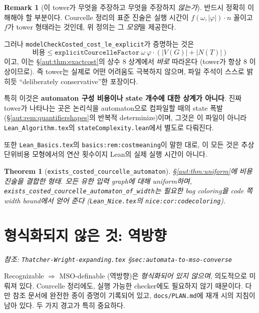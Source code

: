\documentclass[11pt]{article}
\theoremstyle{definition}
\newtheorem{remark}[definition]{Remark}
\theoremstyle{plain}
\newtheorem{theorem}[definition]{Theorem}
\newcommand{\MSO}{\mathrm{MSO}}
\newcommand{\lean}[1]{\texttt{#1}}
\newcommand{\leanfile}[1]{\texttt{#1}}
\begin{document}
\begin{remark}[이 tower가 무엇을 주장하고 무엇을 주장하지 \emph{않는가}]
\label{aut:rem:towerhonest}
반드시 정확히 이해해야 할 부분이다. Courcelle 정리의 표준 진술은 실행 시간이
$f(\omega, |\varphi|) \cdot n$ 꼴이고 $f$가 tower 형태라는 것인데, 위
정의는 그 \emph{모양}을 제공한다.

그러나 \lean{modelCheckCosted\_cost\_le\_explicit}가 증명하는 것은
\[
  \text{비용} \le \lean{explicitCourcelleFactor}\ \omega\ \varphi
    \cdot (|V(G)| + |N(T)|)
\]
이고, 이는 \S\ref{aut:thm:exactcost}의 상수 $8$ 상계에서 \emph{바로} 따라온다
(tower가 항상 $8$ 이상이므로). 즉 tower는 실제로 어떤 어려움도 극복하지
않으며, 파일 주석이 스스로 밝히듯 ``deliberately conservative''한 포장이다.

특히 이것은 \textbf{automaton 구성 비용이나 state 개수에 대한 상계가 아니다}.
진짜 tower가 나타나는 곳은 논리식을 automaton으로 컴파일할 때의 state 폭발
(\S\ref{aut:rem:quantifiershapes}의 반복적 determinize)이며, 그것은 이 파일이
아니라 \leanfile{Lean\_Algorithm.tex}의
\lean{stateComplexity.lean}에서 별도로 다뤄진다.

또한 \leanfile{Lean\_Basics.tex}의 \lean{basics:rem:costmeaning}이 말한
대로, 이 모든 것은 추상 단위비용 모형에서의 연산 횟수이지 Lean의 실제 실행
시간이 아니다.
\end{remark}

\begin{theorem}[\lean{exists\_costed\_courcelle\_automaton}]
\label{aut:thm:costedcourcelle}
\S\ref{aut:thm:uniform}에 비용 진술을 결합한 형태. 모든 유한 입력 graph에
대해 uniform하며, \lean{exists\_costed\_courcelle\_automaton\_of\_width}는
필요한 bag coloring을 code 쪽 width bound에서 얻어 준다
(\leanfile{Lean\_Nice.tex}의 \lean{nice:cor:codecoloring}).
\end{theorem}

\section{형식화되지 않은 것: 역방향}
\label{aut:sec:converse}

\emph{참조: \leanfile{Thatcher-Wright-expanding.tex}
\S\lean{sec:automata-to-mso-converse}}

Recognizable $\Rightarrow$ $\MSO$-definable (역방향)은 \emph{형식화되어 있지
않으며}, 의도적으로 미뤄져 있다. Courcelle 정리에도, 실행 가능한 checker에도
필요하지 않기 때문이다. 다만 참조 문서에 완전한 종이 증명이 기록되어 있고,
\leanfile{docs/PLAN.md}에 재개 시의 지침이 남아 있다. 두 가지 경고가 특히
중요하다.
\end{document}
